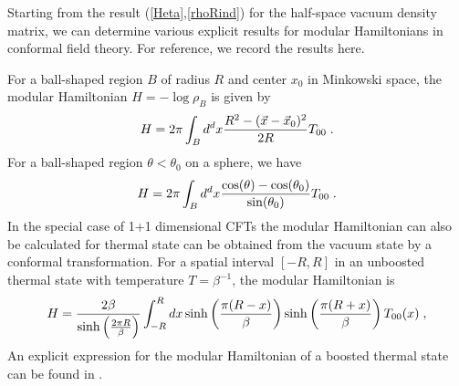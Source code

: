 \documentclass[12pt,epsf]{article}
\newcommand{\be}{\begin{equation}}
\newcommand{\ee}{\end{equation}}
\begin{document}
Starting from the result (\ref{Heta},\ref{rhoRind}) for the half-space vacuum density matrix, we can determine various explicit results for modular Hamiltonians in conformal field theory. For reference, we record the results here.

For a ball-shaped region $B$ of radius $R$ and center $x_0$ in Minkowski space, the modular Hamiltonian $H = -\log \rho_B$ is given by
\be
H = 2 \pi \int_B d^d x {R^2 - (\vec{x} - \vec{x}_0)^2 \over 2 R} T_{00} \; .
\ee
For a ball-shaped region $\theta < \theta_0$ on a sphere, we have
\be
\label{modHsphere}
H = 2 \pi \int_B d^d x {\cos(\theta) - \cos(\theta_0) \over \sin(\theta_0)} T_{00} \; .
\ee
In the special case of 1+1 dimensional CFTs the modular Hamiltonian can also be calculated for thermal state can be obtained from the vacuum state by a conformal transformation. For a spatial interval $[-R,R]$ in an unboosted thermal state with temperature $T = \beta^{-1}$, the modular Hamiltonian is
\be
\label{HmodTherm}
H = {2 \beta \over \sinh \left({2 \pi R  \over \beta}\right)} \int_{-R}^R d x \sinh\left({\pi (R-x) \over \beta} \right) \sinh\left({\pi (R+x) \over \beta} \right) T_{00}(x) \; ,
\ee
An explicit expression for the modular Hamiltonian of a boosted thermal state can be found in \cite{Lashkari:2014kda}.




\end{document}

